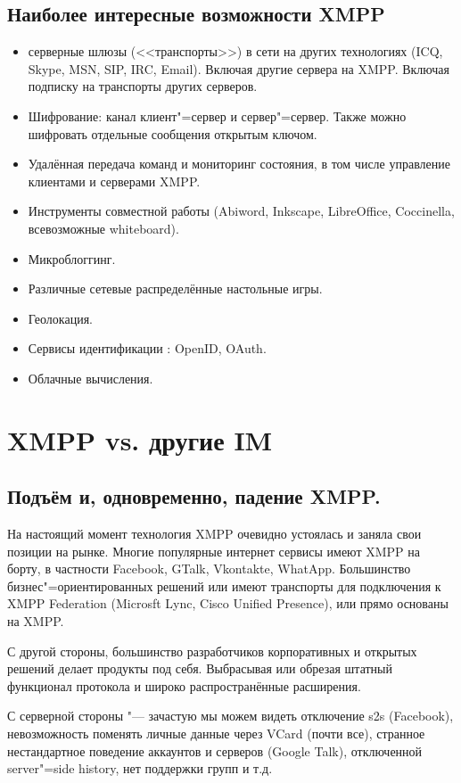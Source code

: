 \documentclass[10pt, a5paper]{article}
\begin{document}
\subsection{Наиболее интересные возможности XMPP}

\begin{itemize}
  \item серверные шлюзы (<<транспорты>>) в сети на других технологиях (ICQ, Skype, MSN, SIP, IRC, Email). Включая другие сервера на XMPP. Включая подписку на транспорты других серверов.
  \item Шифрование: канал клиент"=сервер и сервер"=сервер. Также можно шифровать отдельные сообщения открытым ключом.
  \item Удалённая передача команд и мониторинг состояния, в том числе управление клиентами и серверами XMPP.
  \item Инструменты совместной работы (Abiword, Inkscape, LibreOffice, Coccinella, всевозможные whiteboard).
  \item Микроблоггинг.
  \item Различные сетевые распределённые настольные игры.
  \item Геолокация.
  \item Сервисы идентификации : OpenID, OAuth.
  \item Облачные вычисления.
\end{itemize}

\section{XMPP vs. другие IM}

\subsection{Подъём и, одновременно, падение XMPP.}

На настоящий момент технология  XMPP очевидно устоялась и заняла свои позиции на рынке. Многие популярные интернет сервисы имеют XMPP на борту, в частности Facebook, GTalk, Vkontakte, WhatApp. Большинство бизнес"=ориентированных решений или имеют транспорты для подключения к XMPP Federation (Microsft Lync, Cisco Unified Presence), или прямо основаны на XMPP.

С другой стороны, большинство разработчиков корпоративных и открытых решений делает продукты под себя.  Выбрасывая или обрезая штатный функционал протокола и широко распространённые расширения.

С серверной стороны "--- зачастую мы можем видеть отключение s2s (Facebook), невозможность поменять личные данные через VCard (почти все), странное нестандартное поведение аккаунтов и серверов (Google Talk), отключенной server"=side history, нет поддержки групп  и т.д.
\end{document}
